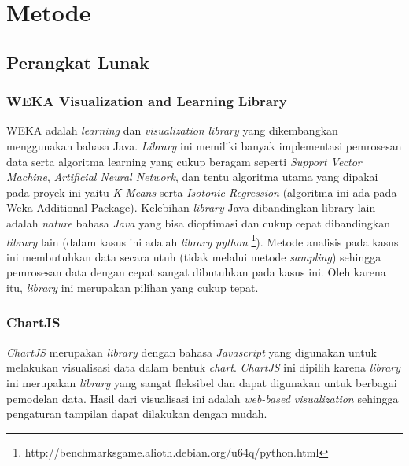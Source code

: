 \documentclass{article}
\begin{document}
\section{Metode}

\subsection{Perangkat Lunak}

\subsubsection{WEKA Visualization and Learning Library}
\begin{adjustwidth}{4em}{0pt}

\hspace{\parindent}WEKA adalah \textit{learning} dan \textit{visualization} \textit{library} yang dikembangkan menggunakan bahasa Java. \textit{Library} ini memiliki banyak implementasi pemrosesan data serta algoritma learning yang cukup beragam seperti \textit{Support Vector Machine}, \textit{Artificial Neural Network}, dan tentu algoritma utama yang dipakai pada proyek ini yaitu \textit{K-Means} serta \textit{Isotonic Regression} (algoritma ini ada pada Weka Additional Package). Kelebihan \textit{library} Java dibandingkan library lain adalah \textit{nature} bahasa \textit{Java} yang bisa dioptimasi dan cukup cepat dibandingkan \textit{library} lain (dalam kasus ini adalah \textit{library} \textit{python} \footnote{http://benchmarksgame.alioth.debian.org/u64q/python.html}). Metode analisis pada kasus ini membutuhkan data secara utuh (tidak melalui metode \textit{sampling}) sehingga pemrosesan data dengan cepat sangat dibutuhkan pada kasus ini. Oleh karena itu, \textit{library} ini merupakan pilihan yang cukup tepat.

\end{adjustwidth}

\subsubsection{ChartJS}
\begin{adjustwidth}{4em}{0pt}
	
\hspace{\parindent}\textit{ChartJS} merupakan \textit{library} dengan bahasa \textit{Javascript} yang digunakan untuk melakukan visualisasi data dalam bentuk \textit{chart}. \textit{ChartJS} ini dipilih karena \textit{library} ini merupakan \textit{library} yang sangat fleksibel dan dapat digunakan untuk berbagai pemodelan data. Hasil dari visualisasi ini adalah \textit{web-based visualization} sehingga pengaturan tampilan dapat dilakukan dengan mudah.

\end{adjustwidth}
\end{document}
